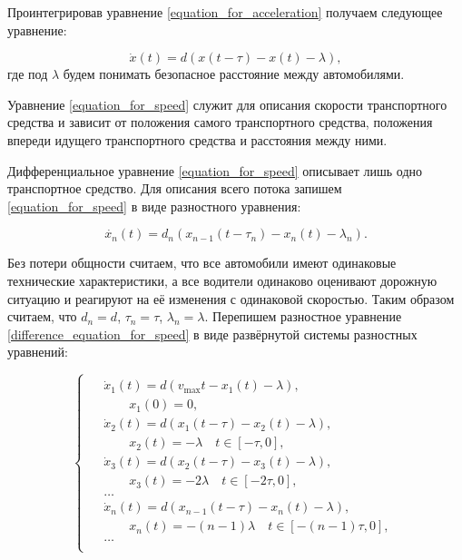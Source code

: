 \documentclass[12pt, a4paper]{extarticle}
\numberwithin{equation}{section}
\begin{document}
Проинтегрировав уравнение \eqref{equation_for_acceleration} получаем следующее уравнение: 

\begin{equation} \label{equation_for_speed}
\dot{x}(t) = d(x(t-\tau) - x(t) - \lambda),
\end{equation}
где под $\lambda$ будем понимать безопасное расстояние между автомобилями.

Уравнение \eqref{equation_for_speed} служит для описания скорости транспортного средства и зависит от положения самого транспортного средства, положения впереди идущего транспортного средства и расстояния между ними. 

Дифференциальное уравнение \eqref{equation_for_speed} описывает лишь одно транспортное средство. Для описания всего потока запишем \eqref{equation_for_speed} в виде разностного уравнения:

\begin{equation} \label{difference_equation_for_speed}
\dot{x_n}(t) = d_n(x_{n-1}(t-\tau_n) - x_n(t) - \lambda_n).
\end{equation}

Без потери общности считаем, что все автомобили имеют одинаковые технические характеристики, а все водители одинаково оценивают дорожную ситуацию и реагируют на её изменения с одинаковой скоростью. Таким образом считаем, что $d_n = d$, $\tau_n = \tau$, $\lambda_n = \lambda$. Перепишем разностное уравнение \eqref{difference_equation_for_speed} в виде развёрнутой системы разностных уравнений:

\begin{equation} \label{equation_without_stopping}
\begin{cases}
\begin{split}
&\dot{x}_1(t) = d (v_{\max} t - x_1(t) - \lambda), \\ 
&\qquad x_1(0) = 0, \\
&\dot{x}_2(t) = d (x_1(t-\tau)-x_2(t) - \lambda), \\
&\qquad x_2(t) = -\lambda \quad t \in [-\tau, 0], \\
&\dot{x}_3(t) = d (x_2(t-\tau)-x_3(t) - \lambda), \\
&\qquad x_3(t) = -2\lambda \quad t \in [-2\tau, 0], \\
&\ldots \\
&\dot{x}_n(t) = d ({x}_{n-1}(t-\tau)-x_n(t) - \lambda), \\
&\qquad x_n(t) = -(n-1)\lambda \quad t \in [-(n-1)\tau, 0], \\
&\ldots \\
\end{split}
\end{cases}
\end{equation}
\end{document}
